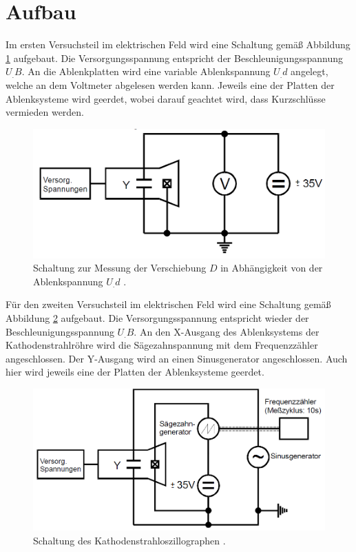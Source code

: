 \section{Aufbau}
\label{sec:Aufbau}

Im ersten Versuchsteil im elektrischen Feld wird eine Schaltung gemäß Abbildung \ref{fig:Aufbau-E1} aufgebaut. Die Versorgungsspannung entspricht der Beschleunigungsspannung $U_.B$. An die Ablenkplatten wird eine variable Ablenkspannung $U_.d$ angelegt, welche an dem Voltmeter abgelesen werden kann. Jeweils eine der Platten der Ablenksysteme wird geerdet, wobei darauf geachtet wird, dass Kurzschlüsse vermieden werden.

\begin{figure}
\centering
\includegraphics[width=\linewidth-70pt,height=\textheight-70pt,keepaspectratio]{content/images/Aufbau-E-Feld1.jpg}
\caption{Schaltung zur Messung der Verschiebung $D$ in Abhängigkeit von der Ablenkspannung $U_.d$ \cite{V501}.}
\label{fig:Aufbau-E1}
\end{figure}

\noindent Für den zweiten Versuchsteil im elektrischen Feld wird eine Schaltung gemäß Abbildung \ref{fig:Aufbau-E2} aufgebaut. Die Versorgungsspannung entspricht wieder der Beschleunigungsspannung $U_.B$. An den X-Ausgang des Ablenksystems der Kathodenstrahlröhre wird die Sägezahnspannung mit dem Frequenzzähler angeschlossen. Der Y-Ausgang wird an einen Sinusgenerator angeschlossen. Auch hier wird jeweils eine der Platten der Ablenksysteme geerdet.

\begin{figure}
\centering
\includegraphics[width=\linewidth-70pt,height=\textheight-70pt,keepaspectratio]{content/images/Aufbau-E-Feld2.jpg}
\caption{Schaltung des Kathodenstrahloszillographen \cite{V501}.}
\label{fig:Aufbau-E2}
\end{figure}

